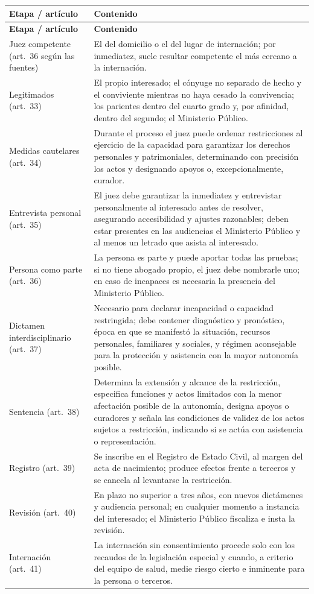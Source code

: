 \documentclass[12pt,oneside]{book}
\begin{document}
\begin{longtable}{@{}B{0.20\textwidth}L{0.70\textwidth}@{}}
\toprule
\textbf{Etapa / artículo} & \textbf{Contenido} \\
\midrule
\endfirsthead
\toprule
\textbf{Etapa / artículo} & \textbf{Contenido} \\
\midrule
\endhead
\bottomrule
\endfoot
Juez competente (art.~36 según las fuentes) & El del domicilio o el del lugar de internación; por inmediatez, suele resultar competente el más cercano a la internación. \\
Legitimados (art.~33) & El propio interesado; el cónyuge no separado de hecho y el conviviente mientras no haya cesado la convivencia; los parientes dentro del cuarto grado y, por afinidad, dentro del segundo; el Ministerio Público. \\
Medidas cautelares (art.~34) & Durante el proceso el juez puede ordenar restricciones al ejercicio de la capacidad para garantizar los derechos personales y patrimoniales, determinando con precisión los actos y designando apoyos o, excepcionalmente, curador. \\
Entrevista personal (art.~35) & El juez debe garantizar la inmediatez y entrevistar personalmente al interesado antes de resolver, asegurando accesibilidad y ajustes razonables; deben estar presentes en las audiencias el Ministerio Público y al menos un letrado que asista al interesado. \\
Persona como parte (art.~36) & La persona es parte y puede aportar todas las pruebas; si no tiene abogado propio, el juez debe nombrarle uno; en caso de incapaces es necesaria la presencia del Ministerio Público. \\
Dictamen interdisciplinario (art.~37) & Necesario para declarar incapacidad o capacidad restringida; debe contener diagnóstico y pronóstico, época en que se manifestó la situación, recursos personales, familiares y sociales, y régimen aconsejable para la protección y asistencia con la mayor autonomía posible. \\
Sentencia (art.~38) & Determina la extensión y alcance de la restricción, especifica funciones y actos limitados con la menor afectación posible de la autonomía, designa apoyos o curadores y señala las condiciones de validez de los actos sujetos a restricción, indicando si se actúa con asistencia o representación. \\
Registro (art.~39) & Se inscribe en el Registro de Estado Civil, al margen del acta de nacimiento; produce efectos frente a terceros y se cancela al levantarse la restricción. \\
Revisión (art.~40) & En plazo no superior a tres años, con nuevos dictámenes y audiencia personal; en cualquier momento a instancia del interesado; el Ministerio Público fiscaliza e insta la revisión. \\
Internación (art.~41) & La internación sin consentimiento procede solo con los recaudos de la legislación especial y cuando, a criterio del equipo de salud, medie riesgo cierto e inminente para la persona o terceros. \\
\end{longtable}
\end{document}
